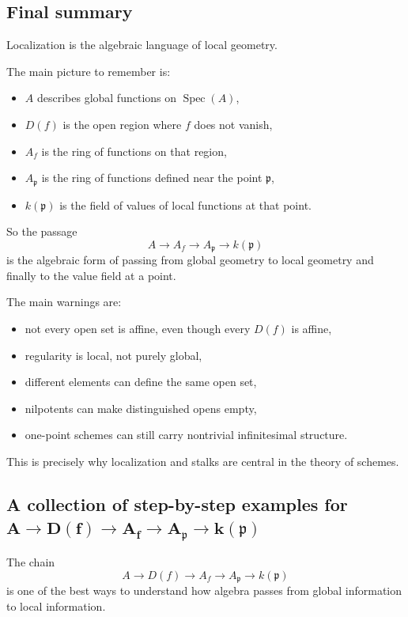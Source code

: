 \documentclass[12pt,a4paper]{article}
\theoremstyle{notespace}
\newcommand{\Spec}{\operatorname{Spec}}
\newcommand{\mf}{\mathfrak}
\theoremstyle{definition}
\begin{document}
\subsection{Final summary}

Localization is the algebraic language of local geometry.

The main picture to remember is:

\begin{itemize}
	\item \(A\) describes global functions on \(\Spec(A)\),
	\item \(D(f)\) is the open region where \(f\) does not vanish,
	\item \(A_f\) is the ring of functions on that region,
	\item \(A_{\mf p}\) is the ring of functions defined near the point \(\mf p\),
	\item \(k(\mf p)\) is the field of values of local functions at that point.
\end{itemize}

So the passage
\[
A \longrightarrow A_f \longrightarrow A_{\mf p} \longrightarrow k(\mf p)
\]
is the algebraic form of passing from global geometry to local geometry and finally to the value field at a point.

The main warnings are:

\begin{itemize}
	\item not every open set is affine, even though every \(D(f)\) is affine,
	\item regularity is local, not purely global,
	\item different elements can define the same open set,
	\item nilpotents can make distinguished opens empty,
	\item one-point schemes can still carry nontrivial infinitesimal structure.
\end{itemize}

This is precisely why localization and stalks are central in the theory of schemes.

\subsection{A collection of step-by-step examples for
	\(\boldsymbol{A \to D(f) \to A_f \to A_{\mf p} \to k(\mf p)}\)}

The chain
\[
A \longrightarrow D(f) \longrightarrow A_f \longrightarrow A_{\mf p} \longrightarrow k(\mf p)
\]
is one of the best ways to understand how algebra passes from global information to local information.
\end{document}
